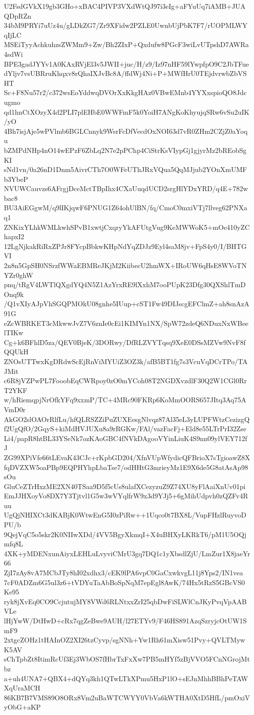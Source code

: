 U2FsdGVkX19gb3GHo+xBAC4PIVP3VXdWtQJ97i3eIg+aFYuUq7iAMB+JUAQDpRZn
34bM9PRYi7uUz4u/gLDkZG7/Zr9XFidw2PZLE0UwnbUjPbK7F7/rUOPMLWYqIjLC
MSEiTyyAchkuhzsZWMm9+Zw/Bh2ZIxP+Qxdufw8PGcF3wiLvUTpshD7AWRa4sdWi
BPE3gadJYYv1A0KAxRVjEl3v5JWII+juc/H/z9/Iz97nHF59lYwpfpO9C2JbTFue
dYljv7vsUBRruKhqxv8rQhaIXJvBc8A/ffdWj4Ni+P+MWfHrU0TEjdvrwbZbVSHT
Sc+F8Nu57r2/c372wsEoYddwqDVOrXxKkgHAz0VBwEMnb4YYXxspioQO8Jdcugmo
qd1hnCtXOzyX4d2PLI7plEHbE0WWFmF5k0YoiH7ANgKoKhyujqSRw6vSu2uIK/yO
4Bh7isjAje5wPVlmb6BGLCnnyk9WsrFcDfVecdOxNOI63d7vR0ZHm2CZjZ0aYoqu
bZMPdNHp4nO14wEPzF6ZbLq2N7e2pPChp4CiStrKsVIypGj1gjyrMz2bREobSgKI
sNd1vn/0a26nD1Dnm5AivrCTh7O0WFeUThJRxVQua5QqMJjub2YOnXmUMFb3YbeP
NVUWCauvzs6AFrgjDceMctTBpIhx4CXaUuqdUCD2srgHlYDxYRD/q4E+782wbac8
BU3AiEGgwM/q9lIKjqwF6PNUG1Z64ohUlBN/fq/CmoC0mxiVTj7llveg62PNXaq1
ZNKixYLhkWMLkwhSPvB1xwtjCxqryYkAFUtgVug9KeMWWoK5+mOe410yZChapxI2
12LgNjkakRiRxZPJr8FYcpBbkwKHpNdYqZDJz9Eyl4saM8jv+FpS4y0/I/BHTGVI
2n8n5GpSH0NSrzfWWaEBMReJKjM2KiibecU2hmWX+IRoUW6qHsE8WVoTNYZr0ghW
pnq/tRgV4LWTlQXgdYQ4N5Z1AzYrxRE9lXxhM7ooPUpK23Dfg30QXShlTmDOnq9k
/Q1vXIyAJpVhSGQPMOkU08gnhe5IUup+cST1Fw49DIJscgEFClmZ+ah8snAzA91G
eZcWBRKET3cMkwwJvZ7V6znIe0cEi1KIMYn1NX/SpW72zdeQ6NDuxNxWBeelTIKw
Cg+k6BFhlD5za/QEV0BjeK/3DORwy/DfRLZVYTqsq9XeE0DSsMZVw9NvF8fQQUkH
ZNOsUTTwxKgDRdwScEjRnViMYUiZ3OZ3k/afB5BT1fg7s3VcuVqDCrTPo/TAJMit
c6R8jVZPwPL7FooobEqCWRpoy0zO0mYCoh08T2NGDXvzdlF30Q2W1CGl0RrT2YKF
w/hRiemqpjNrOfkYFq9xxmP/TC+4MRc90FKRp6KoMmOORS657JItq3Aq75AVmD0r
AkGO2slOAOrRlfLu/hfQLRSZZiPuZUXEesgNlvqz87Al35eL3yLUPFWtzCezizgQ
f2UgQfO/2GqyS+kiMdHVJUXu8a9rRGKw/FAl/vazFacFj+Eld8e55LTrPrI32Zse
Li4/papR8htBL33YSeNk7ozKAoGBC4fNVkDAgooVYinLiuK4S9nn09ylVEY712fJ
ZG99XPiVfe66tLEvaK43CJc+rKpbGD204/XfnVUpWfydicQFBrioX7sTgioawZ8X
fqDVZXW5oaPBp9EQPHYhpLbaTse7/odHHtG3mrieyMz1E9X6de5G8atAsAp98sOu
GluCeZTrHxzME2XN40TSaa9D5f5cUs8ulafXCezyzuZ9Z74XU8yFlAaiXnUv01pi
EmJJHXoyVo8DX7Y3Tjtvl1G5w3wVYqlfrW9x3d9YJj5+6gMihUdpvh0zQZFv4Ruu
UgQjNHIXCt3dKABjK0WtwEnG5I0zPiRw++1Uqco0t7BX8L/VupFHzlRuyvoDPU/b
9QejVqC5o5skr2K0NIIwXDd/4VV5BgyXkmqI+X4uBHXyLKRkT6/pM1U5OQjmfq8L
4XK+yMDENxunAiyxLEHLuLvyviCMrU3gq7DQ1c1yXbsdlZjU/LmZur1X8jaeYr66
ZjI7zAy8vA7MCbJTy8hI02xdhx3/cEK9lPA6vpC0GaCxwkvgL11j8Yps2/IN1vea
7cF0ADZm6G5ul3z6+tVDYuTaAbBoSpNqM7epEgl8AwK/74Hx5tRzS5GBcVS0Ke95
ryk8jXvEq0CO9CcjutujMY8VWd6RLNtxxZrI25qbDwFiSLWlCnJKyPvqVpAABVLe
lHjYwW/DtHwD+cRx7qgZeBwe9AUH/l27ETYv9/F46HS891AzqSzryjcOtUW1SmF9
2xtgcZOHz1tHAInOZ2XI26tzCyvp/sgNNh+Yw1Rh61mXisw51Pvy+QVLTMywK5AV
sChTpbZt8ItimRcUf3Ej3WbOS7fHbrTxFxXw7PB5mHYf5zBjVVO5FCnNGrojMtbz
a+uh4UNA7+QBX4+dQYq3kh1QTwLTkXPmu5HxP1lO+sEJnMhhBBhPeTAWXqUraMCH
86KB7B7VMS89O8ORx8Vm2uBaWTCWYY0VbVa6kWTHA0XtD5HfL/pmOxiVyObG+aKP
